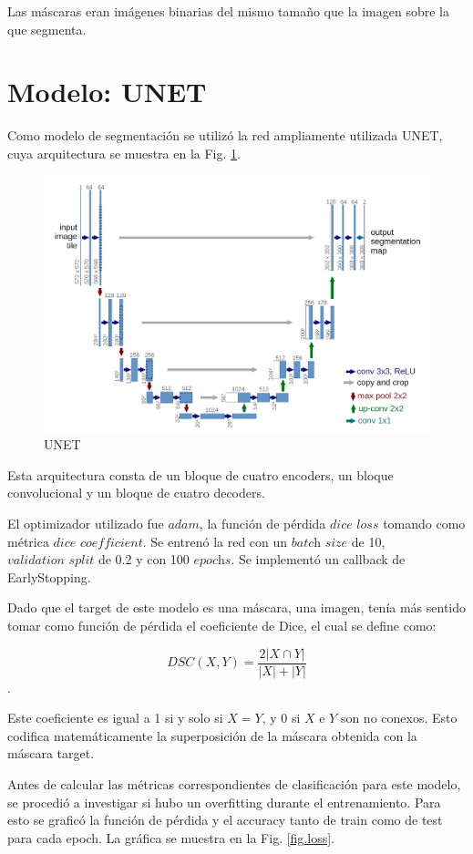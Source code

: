 Las máscaras eran imágenes binarias del mismo tamaño que la imagen sobre la que segmenta. 


\section{Modelo: UNET}

Como modelo de segmentación se utilizó la red ampliamente utilizada UNET, cuya arquitectura se muestra en la Fig. \ref{fig.unet}. 

\begin{figure}[H]
\centering
        \includegraphics[width=0.7\linewidth]{chapters/segmentacion/images/unet.png}
        \caption{UNET}
        \label{fig.unet}
  \end{figure}

Esta arquitectura consta de un bloque de cuatro encoders, un bloque convolucional y un bloque de cuatro decoders. 

El optimizador utilizado fue $\textit{adam}$, la función de pérdida $\textit{dice loss}$ tomando como métrica $\textit{dice coefficient}$. Se entrenó la red con un $\textit{batch size}$ de 10, $\textit{validation split}$ de 0.2 y con 100 $\textit{epochs}$. Se implementó un callback de EarlyStopping. 

Dado que el target de este modelo es una máscara, una imagen, tenía más sentido tomar como función de pérdida el coeficiente de Dice, el cual se define como:

\begin{equation}
DSC(X,Y) = \frac{2|X\cap Y|}{|X|+|Y|}
\end{equation}.

Este coeficiente es igual a 1 si y solo si $X=Y$, y 0 si $X$ e $Y$ son no conexos. Esto codifica matemáticamente la superposición de la máscara obtenida con la máscara target. 

Antes de calcular las métricas correspondientes de clasificación para este modelo, se procedió a investigar si hubo un overfitting durante el entrenamiento. Para esto se graficó la función de pérdida y el accuracy tanto de train como de test para cada epoch. La gráfica se muestra en la Fig. \ref{fig.loss}. 


